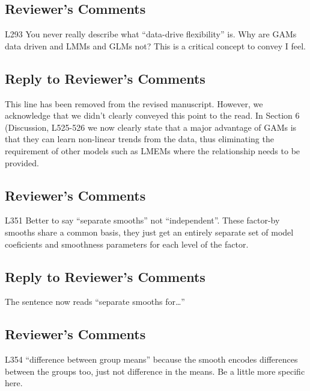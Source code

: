 \documentclass[
]{article}
\begin{document}
\hypertarget{reviewers-comments-22}{%
\subsection{Reviewer's Comments}\label{reviewers-comments-22}}

L293 You never really describe what ``data-drive flexibility'' is. Why are GAMs data driven and LMMs and GLMs not? This is a critical concept to convey I feel.

\hypertarget{section-23}{%
\subsection{\texorpdfstring{\textcolor{reviewersblue} {Reply to Reviewer's Comments}}{}}\label{section-23}}

This line has been removed from the revised manuscript. However, we acknowledge that we didn't clearly conveyed this point to the read. In Section 6 (Discussion, L525-526 we now clearly state that a major advantage of GAMs is that they can learn non-linear trends from the data, thus eliminating the requirement of other models such as LMEMs where the relationship needs to be provided.

\hypertarget{reviewers-comments-23}{%
\subsection{Reviewer's Comments}\label{reviewers-comments-23}}

L351 Better to say ``separate smooths'' not ``independent''. These factor-by smooths share a common basis, they just get an entirely separate set of model coeficients and smoothness parameters for each level of the factor.

\hypertarget{section-24}{%
\subsection{\texorpdfstring{\textcolor{reviewersblue} {Reply to Reviewer's Comments}}{}}\label{section-24}}

The sentence now reads ``separate smooths for\ldots{}''

\hypertarget{reviewers-comments-24}{%
\subsection{Reviewer's Comments}\label{reviewers-comments-24}}

L354 ``difference between group means'' because the smooth encodes differences between the groups too, just not difference in the means. Be a little more specific here.
\end{document}
